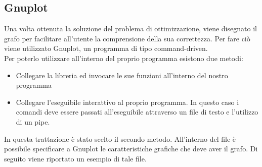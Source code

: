 \begin{center}
\begin{center}
\section{Gnuplot}\label{gnuplot}
Una volta ottenuta la soluzione del problema di ottimizzazione, viene disegnato il grafo per facilitare all'utente la comprensione della sua correttezza. Per fare ciò viene utilizzato Gnuplot, un programma di tipo command-driven.\\
Per poterlo utilizzare all'interno del proprio programma esistono due metodi:
\begin{itemize}
\item{Collegare la libreria ed invocare le sue funzioni all'interno del nostro programma}
\item{Collegare l'eseguibile interattivo al proprio programma. In questo caso i comandi deve essere passati all'eseguibile attraverso un file di testo e l'utilizzo di un pipe.}\\
\end{itemize}
In questa trattazione è stato scelto il secondo metodo. All'interno del file è possibile specificare a Gnuplot le caratteristiche grafiche che deve aver il grafo. Di seguito viene riportato un esempio di tale file.\\




\end{center}
\end{center}
